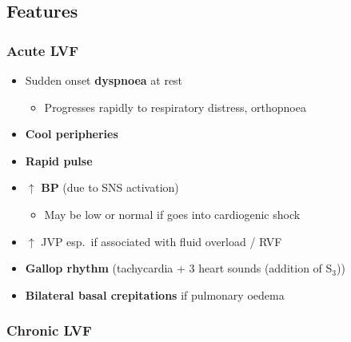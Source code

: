 \documentclass[
  12pt,
]{memoir}
\providecommand{\tightlist}{%
  \setlength{\itemsep}{0pt}\setlength{\parskip}{0pt}}
\begin{document}
\hypertarget{features}{%
\subsection{Features}\label{features}}

\hypertarget{acute-lvf}{%
\subsubsection{Acute LVF}\label{acute-lvf}}

\begin{itemize}
\tightlist
\item
  Sudden onset \textbf{dyspnoea} at rest

  \begin{itemize}
  \tightlist
  \item
    Progresses rapidly to respiratory distress, orthopnoea
  \end{itemize}
\item
  \textbf{Cool peripheries}
\item
  \textbf{Rapid pulse}
\item
  \(\boldsymbol\uparrow\) \textbf{BP} (due to SNS activation)

  \begin{itemize}
  \tightlist
  \item
    May be low or normal if goes into cardiogenic shock
  \end{itemize}
\item
  \(\uparrow\) JVP esp.~if associated with fluid overload / RVF
\item
  \textbf{Gallop rhythm} (tachycardia + 3 heart sounds (addition of
  S\(_3\)))
\item
  \textbf{Bilateral basal crepitations} if pulmonary oedema
\end{itemize}

\hypertarget{chronic-lvf}{%
\subsubsection{Chronic LVF}\label{chronic-lvf}}
\end{document}
